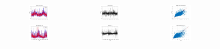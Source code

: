 \begin{figure}[ht!]
  \centering
  \begin{tabular}{ccc}
    \includegraphics[width=0.32\textwidth]{graphs/hybrid/24 hours/mean_fr/actual vs forecast.jpg} &
    \includegraphics[width=0.32\textwidth]{graphs/hybrid/24 hours/mean_fr/residuals.jpg} &
    \includegraphics[width=0.32\textwidth]{graphs/hybrid/24 hours/mean_fr/scatter plot.jpg} \\
    \includegraphics[width=0.32\textwidth]{graphs/hybrid/24 hours/s_wht/actual vs forecast.jpg} &
    \includegraphics[width=0.32\textwidth]{graphs/hybrid/24 hours/s_wht/residuals.jpg} &
    \includegraphics[width=0.32\textwidth]{graphs/hybrid/24 hours/s_wht/scatter plot.jpg} \\

\end{tabular}
\end{figure}
